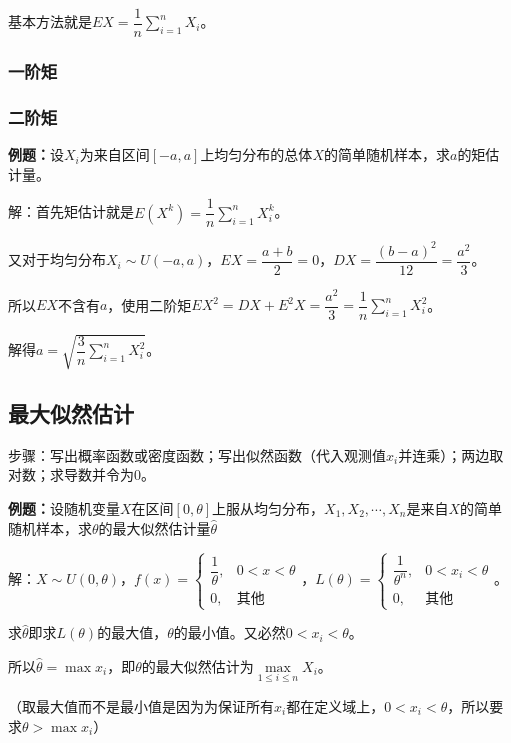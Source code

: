 \documentclass[UTF8, 12pt]{ctexart}
\begin{document}
基本方法就是$EX=\dfrac{1}{n}\sum\limits_{i=1}^nX_i$。

\subsubsection{一阶矩}

\subsubsection{二阶矩}

\textbf{例题：}设$X_i$为来自区间$[-a,a]$上均匀分布的总体$X$的简单随机样本，求$a$的矩估计量。

解：首先矩估计就是$E(X^k)=\dfrac{1}{n}\sum\limits_{i=1}^nX_i^k$。

又对于均匀分布$X_i\sim U(-a,a)$，$EX=\dfrac{a+b}{2}=0$，$DX=\dfrac{(b-a)^2}{12}=\dfrac{a^2}{3}$。

所以$EX$不含有$a$，使用二阶矩$EX^2=DX+E^2X=\dfrac{a^2}{3}=\dfrac{1}{n}\sum\limits_{i=1}^nX_i^2$。

解得$a=\sqrt{\dfrac{3}{n}\sum\limits_{i=1}^nX_i^2}$。

\subsection{最大似然估计}

步骤：写出概率函数或密度函数；写出似然函数（代入观测值$x_i$并连乘）；两边取对数；求导数并令为0。

\textbf{例题：}设随机变量$X$在区间$[0,\theta]$上服从均匀分布，$X_1,X_2,\cdots,X_n$是来自$X$的简单随机样本，求$\theta$的最大似然估计量$\hat{\theta}$

解：$X\sim U(0,\theta)$，$f(x)=\left\{\begin{array}{ll}
    \dfrac{1}{\theta}, & 0<x<\theta \\
    0, & \text{其他}
\end{array}\right.$，$L(\theta)=\left\{\begin{array}{ll}
    \dfrac{1}{\theta^n}, & 0<x_i<\theta \\
    0, & \text{其他}
\end{array}\right.$。

求$\hat{\theta}$即求$L(\theta)$的最大值，$\theta$的最小值。又必然$0<x_i<\theta$。

所以$\hat{\theta}=\max x_i$，即$\theta$的最大似然估计为$\max\limits_{1\leqslant i\leqslant n}X_i$。

（取最大值而不是最小值是因为为保证所有$x_i$都在定义域上，$0<x_i<\theta$，所以要求$\theta>\max x_i$）
\end{document}
